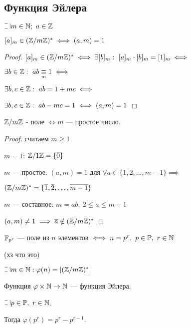 \subsection{Функция Эйлера}

\begin{theorem-non}
    $\letus m \in \N;~a \in \Z$

    $[a]_m \in (\mathbb{Z}/m\mathbb{Z})^* \iff (a, m) = 1$
\end{theorem-non}

\begin{proof}
    
    $[a]_m \in (\mathbb{Z}/m\mathbb{Z})^* \iff \exists [b]_m:~[a]_m \cdot [b]_m = [1]_m \iff$
    
    $\exists b \in \mathbb{Z}:~ab \underset{m}{\equiv} 1 \iff$
    
    $\exists b, c \in \mathbb{Z}:~ab = 1 + mc \iff$
    
    $\exists b, c \in \mathbb{Z}:~ab - mc = 1 \iff (a, m) = 1$
\end{proof}

\begin{follow}
    $\mathbb{Z}/m\mathbb{Z}$ - поле $\iff m$ --- простое число.
\end{follow}

\begin{proof}
    считаем $m \geq 1$
    
    $m = 1$: $\mathbb{Z}/1\mathbb{Z} = \{\overline{0}\}$
    
    $m$ --- простое: $(a, m) = 1$ для $\forall a \in \{1, 2, \ldots, m-1\} \implies$
    
    $(\mathbb{Z}/m\mathbb{Z})^* = \{\overline{1}, \overline{2}, \ldots, \overline{m-1}\}$
    
    $m$ --- составное: $m = ab,~2 \leq a \leq m-1$
    
    $(a, m) \neq 1 \implies \overline{a} \notin (\mathbb{Z}/m\mathbb{Z})^*$
\end{proof}

\begin{defn}
    $\mathbb{F}_{p^r}$ --- поле из $n$ элементов $\iff n = p^r,~p \in \mathbb{P},~r \in \mathbb{N}$

    (хз что это)
\end{defn}

\begin{defn}
    $\letus m \in \N: \varphi(n) = |(\Z/m\Z)^*|$

    Функция $\varphi \times \mathbb{N} \to \mathbb{N}$ --- функция Эйлера.
\end{defn}

\begin{theorem-non}
    $\letus p \in \P,~r \in \N$.

    Тогда $\varphi(p^r) = p^r - p^{r-1}$.
\end{theorem-non}

